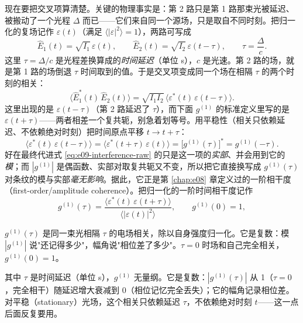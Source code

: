 现在要把交叉项算清楚。关键的物理事实是：第 2 路只是第 1 路那束光被延迟、被搬动了一个光程 \(\Delta\) 而已——它们来自同一个源场，只是取自不同时刻。把归一化的复场记作 \(\varepsilon(t)\)（满足 \(\langle|\varepsilon|^2\rangle=1\)），两路可写成
\[
  \hat E_1(t)=\sqrt{I_1}\,\varepsilon(t),\qquad
  \hat E_2(t)=\sqrt{I_2}\,\varepsilon(t-\tau),\qquad
  \tau=\frac{\Delta}{c}.
\]
这里 \(\tau=\Delta/c\) 是光程差换算成的\emph{时间延迟}（单位 s），\(c\) 是光速。第 2 路的场，就是第 1 路的场倒退 \(\tau\) 时间取到的值。于是交叉项变成同一个场在相隔 \(\tau\) 的两个时刻的相关：
\[
  \big\langle \hat E_1^\ast(t)\,\hat E_2(t)\big\rangle
  =\sqrt{I_1 I_2}\,\big\langle \varepsilon^\ast(t)\,\varepsilon(t-\tau)\big\rangle .
\]
这里出现的是 \(\varepsilon(t-\tau)\)（第 2 路延迟了 \(\tau\)），而下面 \(g^{(1)}\) 的标准定义里写的是 \(\varepsilon(t+\tau)\)——两者相差一个复共轭，别急着划等号。用平稳性（相关只依赖延迟、不依赖绝对时刻）把时间原点平移 \(t\to t+\tau\)：
\[
  \big\langle \varepsilon^\ast(t)\,\varepsilon(t-\tau)\big\rangle
  =\big\langle \varepsilon^\ast(t+\tau)\,\varepsilon(t)\big\rangle
  =\big[g^{(1)}(\tau)\big]^\ast=g^{(1)}(-\tau) .
\]
好在最终代进式 \eqref{eq:e09-interference-raw} 的只是这一项的\emph{实部}、并会用到它的\emph{模}；而 \(|g^{(1)}|\) 是偶函数、实部对取复共轭又不变，所以把它直接换写成 \(g^{(1)}(\tau)\) 对条纹的模与实部\emph{毫无影响}。据此，它正是第 \ref{chap:e08} 章定义过的一阶相干度（first-order/amplitude coherence）。把归一化的一阶时间相干度记作
\begin{equation}
  g^{(1)}(\tau)=
  \frac{\big\langle \varepsilon^\ast(t)\,\varepsilon(t+\tau)\big\rangle}
       {\big\langle |\varepsilon(t)|^2\big\rangle},
  \qquad g^{(1)}(0)=1 ,
  \label{eq:e09-g1-def}
\end{equation}
\begin{formulaexplain}
\(g^{(1)}(\tau)\) 是同一束光相隔 \(\tau\) 的电场相关，除以自身强度归一化。它是复数：模 \(|g^{(1)}|\) 说"还记得多少"，幅角说"相位差了多少"。\(\tau=0\) 时场和自己完全相关，\(g^{(1)}(0)=1\)。
\end{formulaexplain}
其中 \(\tau\) 是时间延迟（单位 s），\(g^{(1)}\) 无量纲。它是复数：\(|g^{(1)}(\tau)|\) 从 1（\(\tau=0\)，完全相干）随延迟增大衰减到 0（相位记忆完全丢失）；它的幅角记录相位差。对平稳（stationary）光场，这个相关只依赖延迟 \(\tau\)，不依赖绝对时刻 \(t\)——这一点后面反复要用。

